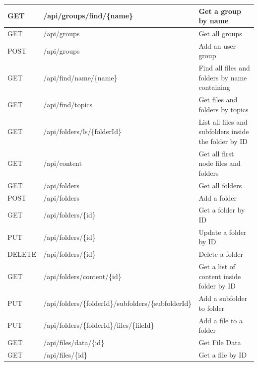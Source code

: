\begin{longtable}{|p{2cm}|p{5cm}|p{5cm}|}
GET &
/api/groups/find/\{name\} &
Get a group by name \\ \hline

GET &
/api/groups &
Get all groups \\ \hline

POST &
/api/groups &
Add an user group \\ \hline

GET &
/api/find/name/\{name\} &
Find all files and folders by name containing \\ \hline

GET &
/api/find/topics &
Get files and folders by topics \\ \hline

GET &
/api/folders/ls/\{folderId\} &
List all files and subfolders inside the folder by ID \\ \hline

GET &
/api/content &
Get all first node files and folders \\ \hline

GET & 
/api/folders &
Get all folders \\ \hline

POST & 
/api/folders &
Add a folder \\ \hline

GET & 
/api/folders/\{id\} &
Get a folder by ID \\ \hline

PUT & 
/api/folders/\{id\} &
Update a folder by ID \\ \hline

DELETE & 
/api/folders/\{id\} &
Delete a folder \\ \hline

GET & 
/api/folders/content/\{id\} &
Get a list of content inside folder by ID \\ \hline

PUT & 
/api/folders/\{folderId\}/\newline subfolders/\{subfolderId\} &
Add a subfolder to folder \\ \hline

PUT & 
/api/folders/\{folderId\}/files/\newline\{fileId\} &
Add a file to a folder \\ \hline

GET &
/api/files/data/\{id\} &
Get File Data \\ \hline

GET &
/api/files/\{id\} &
Get a file by ID \\ \hline


\end{longtable}
